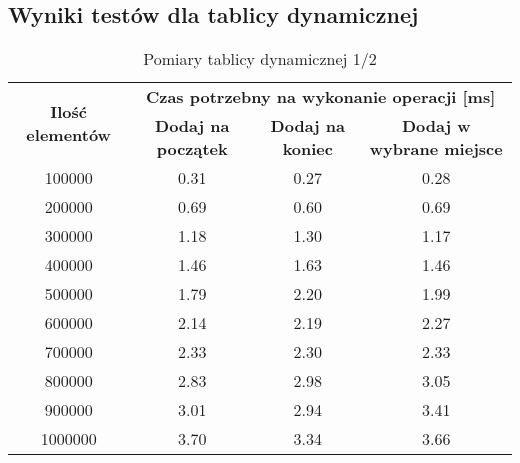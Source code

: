 \documentclass{article}
\begin{document}
    \subsection{Wyniki testów dla tablicy dynamicznej}
    \begin{table}[H]
        \centering
        \begin{tabular}{|c|ccc|}
            \hline
            \multirow{2}{*}{\textbf{Ilość   elementów}} & \multicolumn{3}{c|}{\textbf{Czas   potrzebny na wykonanie operacji {[}ms{]}}} \\ \cline{2-4} 
             & \multicolumn{1}{c|}{\textbf{Dodaj na początek}} & \multicolumn{1}{c|}{\textbf{Dodaj na koniec}} & \textbf{Dodaj w wybrane   miejsce} \\ \hline
            100000 & \multicolumn{1}{c|}{0.31} & \multicolumn{1}{c|}{0.27} & 0.28 \\ \hline
            200000 & \multicolumn{1}{c|}{0.69} & \multicolumn{1}{c|}{0.60} & 0.69 \\ \hline
            300000 & \multicolumn{1}{c|}{1.18} & \multicolumn{1}{c|}{1.30} & 1.17 \\ \hline
            400000 & \multicolumn{1}{c|}{1.46} & \multicolumn{1}{c|}{1.63} & 1.46 \\ \hline
            500000 & \multicolumn{1}{c|}{1.79} & \multicolumn{1}{c|}{2.20} & 1.99 \\ \hline
            600000 & \multicolumn{1}{c|}{2.14} & \multicolumn{1}{c|}{2.19} & 2.27 \\ \hline
            700000 & \multicolumn{1}{c|}{2.33} & \multicolumn{1}{c|}{2.30} & 2.33 \\ \hline
            800000 & \multicolumn{1}{c|}{2.83} & \multicolumn{1}{c|}{2.98} & 3.05 \\ \hline
            900000 & \multicolumn{1}{c|}{3.01} & \multicolumn{1}{c|}{2.94} & 3.41 \\ \hline
            1000000 & \multicolumn{1}{c|}{3.70} & \multicolumn{1}{c|}{3.34} & 3.66 \\ \hline
        \end{tabular}
        \caption{Pomiary tablicy dynamicznej 1/2}
    \end{table}
\end{document}
